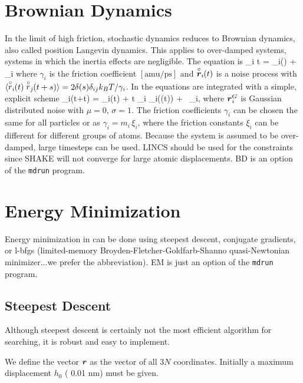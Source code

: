 \section{Brownian Dynamics}
\label{sec:BD}
In the limit of high friction, stochastic dynamics reduces to 
Brownian dynamics, also called position Langevin dynamics.
This applies to over-damped systems, 
{\ie} systems in which the inertia effects are negligible.
The equation is
\beq
{\de {}_i \over \de t} =  _i() + \vrond_i
\eeq 
where $\gamma_i$ is the friction coefficient $[\mbox{amu/ps}]$ and
$\stackrel{\circ}{\mbox{\boldmath ${r}$}}_i\!\!(t)$  is a noise process with 
$\langle \stackrel{\circ}{r}_i\!\!(t) \stackrel{\circ}{r}_j\!\!(t+s) \rangle = 
    2 \delta(s) \delta_{ij} k_B T / \gamma_i$.
In {\gromacs} the equations are integrated with a simple, explicit scheme
\beq
{}_i(t+\Delta t) = _i(t) +
        {\Delta t \over \gamma_i} _i((t)) 
        + \, \ruis_i,
\eeq
where $\mbox{\boldmath ${r}$}^G_i$ is Gaussian distributed noise with $\mu = 0$, $\sigma = 1$.
The friction coefficients $\gamma_i$ can be chosen the same for all
particles or as $\gamma_i = m_i\,\xi_i$, where the friction constants
$\xi_i$ can be different for different groups of atoms. 
Because the system is assumed to be over-damped, large timesteps
can be used. LINCS should be used for the constraints since SHAKE
will not converge for large atomic displacements.
BD is an option of the {\tt mdrun} program.

\section{Energy Minimization}
\label{sec:EM}%
Energy minimization in {\gromacs} can be done using steepest descent,
conjugate gradients, or l-bfgs (limited-memory
Broyden-Fletcher-Goldfarb-Shanno quasi-Newtonian minimizer...we
prefer the abbreviation). EM is just an option of the {\tt mdrun}
program.

\subsection{Steepest Descent}
Although steepest descent is certainly not the most efficient
algorithm for searching, it is robust and easy to implement.

We define the vector $\mbox{\boldmath ${r}$}$ as the vector of all $3N$ coordinates.
Initially a maximum displacement $h_0$ ({\eg} 0.01 nm) must be given. 


